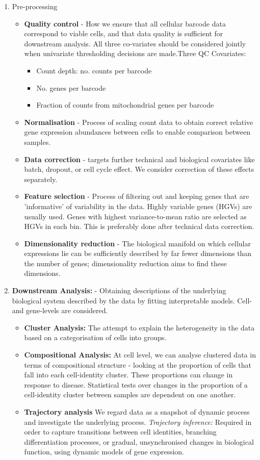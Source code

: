 \documentclass[a4paper,12pt]{article}
\begin{document}
\begin{enumerate}
\item Pre-processing
\begin{itemize}
\item \textbf{Quality control} - How we ensure that all cellular barcode data correspond to viable cells, and that data quality is sufficient for downstream analysis. All three co-variates should be considered jointly when univariate thresholding decisions are made.Three QC Covariates:
\begin{itemize}
\item Count depth: no. counts per barcode
\item No. genes per barcode
\item Fraction of counts from mitochondrial genes per barcode
\end{itemize}
\item \textbf{Normalisation} - Process of scaling count data to obtain correct relative gene expression abundances between cells to enable comparison between samples.
\item \textbf{Data correction} -  targets further technical and biological covariates like batch, dropout, or cell cycle effect. We consider correction of these effects separately.
\item \textbf{Feature selection} - Process of filtering out and keeping genes that are 'informative' of variability in the data. Highly variable genes (HGVs) are usually used. Genes with highest variance-to-mean ratio are selected as HGVs in each bin. This is preferably done after technical data correction.
\item \textbf{Dimensionality reduction} - The biological manifold on which cellular expressions lie can be sufficiently described by far fewer dimensions than the number of genes; dimensionality reduction aims to find these dimensions.
\end{itemize}
\item \textbf{Downstream Analysis:} - Obtaining descriptions of the underlying biological system described by the data by fitting interpretable models. Cell- and gene-levels are considered.
\begin{itemize}
\item \textbf{Cluster Analysis:} The attempt to explain the heterogeneity in the data based on a categorisation of cells into groups.
\item \textbf{Compositional Analysis:}
At cell level, we can analyse clustered data in terms of compositional structure - looking at the proportion of cells that fall into each cell-identity cluster. These proportions can change in response to disease.
Statistical tests over changes in the proportion of a cell-identity cluster between samples are dependent on one another.
\item \textbf{Trajectory analysis}
We regard data as a snapshot of  dynamic process and investigate the underlying process. \textit{Trajectory inference:}
Required in order to capture transitions between cell identities, branching differentiation processes, or gradual, unsynchronised changes in biological function, using dynamic models of gene expression.
\end{itemize}
\end{enumerate}
\end{document}
